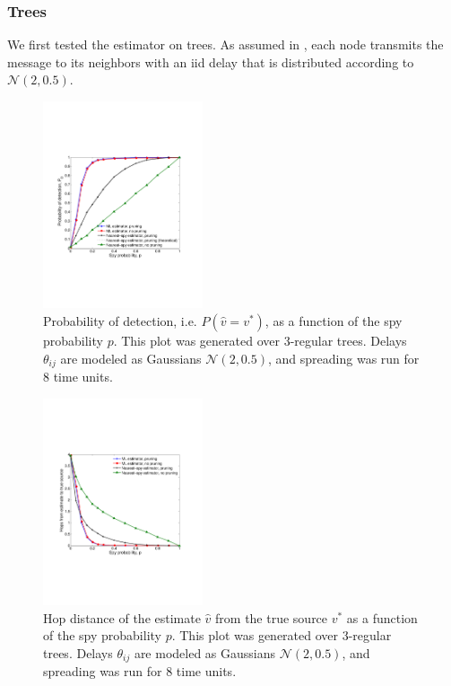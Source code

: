 \subsubsection{Trees}
We first tested the estimator on trees. As assumed in \cite{pinto}, each node transmits the message to its neighbors with an iid delay that is distributed according to $\mathcal N(2,0.5)$.
\begin{figure}
\centering
\includegraphics[height = 2.4in]{figures/pd_vs_spies}
\caption{Probability of detection, i.e. $P(\hat v = v^*)$, as a function of the spy probability $p$. This plot was generated over 3-regular trees. Delays $\theta_{ij}$ are modeled as Gaussians $\mathcal N(2,0.5)$, and spreading was run for 8 time units.}
\label{fig:pd_vs_spies}
\end{figure}

\begin{figure}
\centering
\includegraphics[height = 2.4in]{figures/hops_vs_spies}
\caption{Hop distance of the estimate $\hat v$ from the true source $v^*$ as a function of the spy probability $p$. This plot was generated over 3-regular trees. Delays $\theta_{ij}$ are modeled as Gaussians $\mathcal N(2,0.5)$, and spreading was run for 8 time units.}
\label{fig:pd_vs_spies}
\end{figure}

